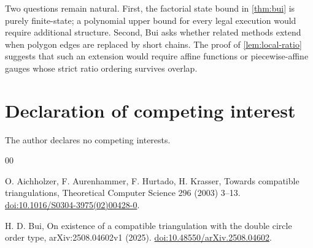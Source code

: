 \documentclass[final,5p,times,twocolumn]{elsarticle}
\theoremstyle{definition}
\theoremstyle{remark}
\begin{document}
Two questions remain natural. First, the factorial state bound in \cref{thm:bui} is purely finite-state; a polynomial upper bound for every legal execution would require additional structure. Second, Bui asks whether related methods extend when polygon edges are replaced by short chains. The proof of \cref{lem:local-ratio} suggests that such an extension would require affine functions or piecewise-affine gauges whose strict ratio ordering survives overlap.

\section*{Declaration of competing interest}
The author declares no competing interests.

\begin{thebibliography}{00}

O. Aichholzer, F. Aurenhammer, F. Hurtado, H. Krasser,
Towards compatible triangulations,
Theoretical Computer Science 296 (2003) 3--13.
\href{https://doi.org/10.1016/S0304-3975(02)00428-0}{doi:10.1016/S0304-3975(02)00428-0}.

H. D. Bui,
On existence of a compatible triangulation with the double circle order type,
arXiv:2508.04602v1 (2025).
\href{https://doi.org/10.48550/arXiv.2508.04602}{doi:10.48550/arXiv.2508.04602}.

\end{thebibliography}
\end{document}
